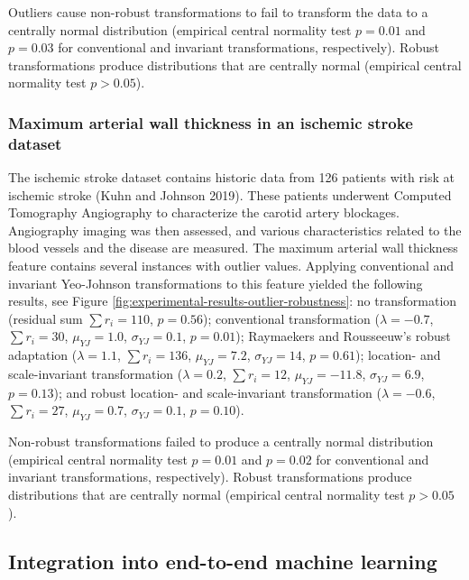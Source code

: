 \documentclass[
  a4paper,
]{article}
\begin{document}
Outliers cause non-robust transformations to fail to transform the data
to a centrally normal distribution (empirical central normality test
\(p = 0.01\) and \(p=0.03\) for conventional and invariant
transformations, respectively). Robust transformations produce
distributions that are centrally normal (empirical central normality
test \(p > 0.05\)).

\subsubsection{Maximum arterial wall thickness in an ischemic stroke
dataset}\label{maximum-arterial-wall-thickness-in-an-ischemic-stroke-dataset}

The ischemic stroke dataset contains historic data from 126 patients
with risk at ischemic stroke (Kuhn and Johnson 2019). These patients
underwent Computed Tomography Angiography to characterize the carotid
artery blockages. Angiography imaging was then assessed, and various
characteristics related to the blood vessels and the disease are
measured. The maximum arterial wall thickness feature contains several
instances with outlier values. Applying conventional and invariant
Yeo-Johnson transformations to this feature yielded the following
results, see Figure \ref{fig:experimental-results-outlier-robustness}:
no transformation (residual sum \(\sum r_i = 110\), \(p=0.56\));
conventional transformation (\(\lambda = -0.7\), \(\sum r_i = 30\),
\(\mu_{YJ} = 1.0\), \(\sigma_{YJ} = 0.1\), \(p=0.01\)); Raymaekers and
Rousseeuw's robust adaptation (\(\lambda = 1.1\), \(\sum r_i = 136\),
\(\mu_{YJ} = 7.2\), \(\sigma_{YJ} = 14\), \(p=0.61\)); location- and
scale-invariant transformation (\(\lambda = 0.2\), \(\sum r_i = 12\),
\(\mu_{YJ} = -11.8\), \(\sigma_{YJ} = 6.9\), \(p=0.13\)); and robust
location- and scale-invariant transformation (\(\lambda = -0.6\),
\(\sum r_i = 27\), \(\mu_{YJ} = 0.7\), \(\sigma_{YJ} = 0.1\),
\(p=0.10\)).

Non-robust transformations failed to produce a centrally normal
distribution (empirical central normality test \(p=0.01\) and \(p=0.02\)
for conventional and invariant transformations, respectively). Robust
transformations produce distributions that are centrally normal
(empirical central normality test \(p > 0.05\)).

\subsection{Integration into end-to-end machine
learning}\label{integration-into-end-to-end-machine-learning}
\end{document}
